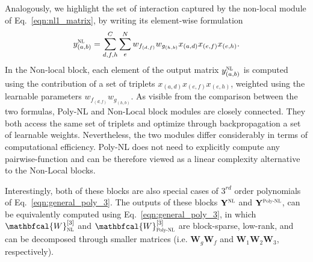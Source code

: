 \documentclass[10pt,twocolumn,letterpaper]{article}
\begin{document}
Analogously, we highlight the set of interaction captured by the non-local module of Eq.~\eqref{eqn:nl1_matrix}, by writing its element-wise formulation
\begin{equation}
y_{(a,b)}^{\scalebox{.6}[.6]{NL}} = \sum_{d,f,h}^{C}\sum_{e}^{N} w_{f_{(d,f)}} w_{g_{(h,b)}} x_{(a,d)} x_{(e,f)} x_{(e,h)}.  
\label{eqn:nl1_element-wise}
\end{equation}
In the Non-local block, each element of the output matrix $y_{(a,b)}^{\scalebox{.6}[.6]{NL}}$ is computed using the contribution of a set of triplets $x_{(a,d)} x_{(e,f)} x_{(e,h)}$, weighted using the learnable parameters $w_{f_{(d,f)}} w_{g_{(h,b)}}$. As visible from the comparison between the two formulas, Poly-NL and Non-Local block modules are closely connected. They both access the same set of triplets and optimize through backpropagation a set of learnable weights. Nevertheless, the two modules differ considerably in terms of computational efficiency. Poly-NL does not need to explicitly compute any pairwise-function and can be therefore viewed as a linear complexity alternative to the Non-Local blocks.  

Interestingly, both of these blocks are also special cases of $3^{rd}$ order polynomials of Eq.~\eqref{eqn:general_poly_3}.
The outputs of these blocks $\mathbf{Y}^{{\scalebox{.6}[.6]{NL}}}$ and $\mathbf{Y}^{{\scalebox{.6}[.6]{Poly-NL}}}$, can be equivalently computed using Eq.~\eqref{eqn:general_poly_3}, in which $\mathbfcal{W}^{[3]}_{{\scalebox{.6}[.6]{NL}}}$ and $\mathbfcal{W}^{[3]}_{{\scalebox{.6}[.6]{Poly-NL}}}$ are block-sparse, low-rank, and can be decomposed through smaller matrices (i.e. $\mathbf{W}_g \mathbf{W}_f$ and $\mathbf{W}_{1} \mathbf{W}_{2} \mathbf{W}_{3}$, respectively). 
\end{document}
